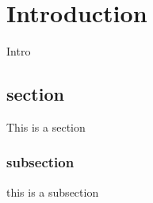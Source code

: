 \chapter{Introduction}
\label{introduction}

Intro
\section{section}
This is a section
\subsection{subsection}
this is a subsection
